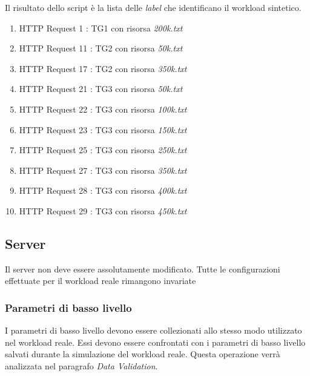 Il risultato dello script è la lista delle \textit{label} che identificano il workload sintetico.
\begin{enumerate}
	\item HTTP Request 1 :  TG1 con risorsa \textit{200k.txt}
	\item HTTP Request 11 : TG2 con risorsa \textit{50k.txt}
	\item HTTP Request 17 : TG2 con risorsa \textit{350k.txt}
	\item HTTP Request 21 : TG3 con risorsa \textit{50k.txt}	
	\item HTTP Request 22 : TG3 con risorsa \textit{100k.txt}		
	\item HTTP Request 23 : TG3 con risorsa \textit{150k.txt}		
	\item HTTP Request 25 : TG3 con risorsa \textit{250k.txt}		
	\item HTTP Request 27 : TG3 con risorsa \textit{350k.txt}
	\item HTTP Request 28 : TG3 con risorsa \textit{400k.txt}			
	\item HTTP Request 29 : TG3 con risorsa \textit{450k.txt}		
\end{enumerate}

\subsection{Server}
Il server non deve essere assolutamente modificato. Tutte le configurazioni effettuate per il workload reale rimangono invariate

\subsubsection{Parametri di basso livello}
I parametri di basso livello devono essere collezionati allo stesso modo utilizzato nel workload reale. Essi devono essere confrontati con i parametri di basso livello salvati durante la simulazione del workload reale. Questa operazione verrà analizzata nel paragrafo \textit{Data Validation}.

